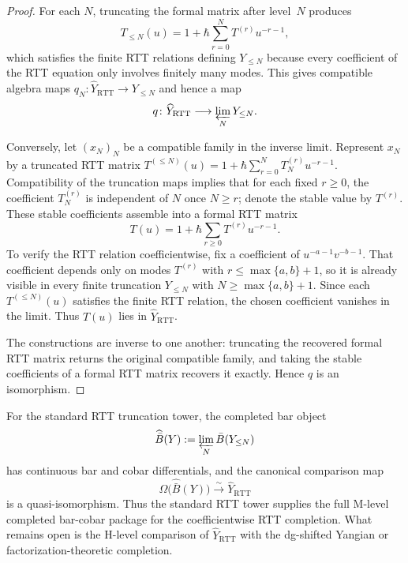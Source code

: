 \begin{proof}
For each $N$, truncating the formal matrix after level~$N$ produces
\[
T_{\le N}(u)=1+\hbar\sum_{r=0}^N T^{(r)}u^{-r-1},
\]
which satisfies the finite RTT relations defining $Y_{\le N}$ because
every coefficient of the RTT equation only involves finitely many modes.
This gives compatible algebra maps
$q_N\colon \widehat Y_{\mathrm{RTT}} \to Y_{\le N}$ and hence a map
\[
q\colon \widehat Y_{\mathrm{RTT}} \longrightarrow \varprojlim_N Y_{\le N}.
\]

Conversely, let $(x_N)_N$ be a compatible family in the inverse limit.
Represent $x_N$ by a truncated RTT matrix
$T^{(\le N)}(u)=1+\hbar\sum_{r=0}^N T_N^{(r)}u^{-r-1}$.
Compatibility of the truncation maps implies that for each fixed
$r \ge 0$, the coefficient $T_N^{(r)}$ is independent of $N$ once
$N \ge r$; denote the stable value by $T^{(r)}$. These stable
coefficients assemble into a formal RTT matrix
\[
T(u)=1+\hbar\sum_{r \ge 0} T^{(r)}u^{-r-1}.
\]
To verify the RTT relation coefficientwise, fix a coefficient of
$u^{-a-1}v^{-b-1}$. That coefficient depends only on modes
$T^{(r)}$ with $r \le \max\{a,b\}+1$, so it is already visible in every
finite truncation $Y_{\le N}$ with $N \ge \max\{a,b\}+1$. Since each
$T^{(\le N)}(u)$ satisfies the finite RTT relation, the chosen
coefficient vanishes in the limit. Thus $T(u)$ lies in
$\widehat Y_{\mathrm{RTT}}$.

The constructions are inverse to one another: truncating the recovered
formal RTT matrix returns the original compatible family, and taking the
stable coefficients of a formal RTT matrix recovers it exactly. Hence
$q$ is an isomorphism.
\end{proof}

\begin{corollary}
\label{cor:yangian-standard-mc4-package}
For the standard RTT truncation tower, the completed bar object
\[
\widehat{\bar B}(Y) := \varprojlim_N \bar B(Y_{\le N})
\]
has continuous bar and cobar differentials, and the canonical
comparison map
\[
\Omega\bigl(\widehat{\bar B}(Y)\bigr) \xrightarrow{\sim}
\widehat Y_{\mathrm{RTT}}
\]
is a quasi-isomorphism.
Thus the standard RTT tower supplies the full M-level completed
bar-cobar package for the coefficientwise RTT completion. What remains
open is the H-level comparison of $\widehat Y_{\mathrm{RTT}}$ with the
dg-shifted Yangian or factorization-theoretic completion.
\end{corollary}

